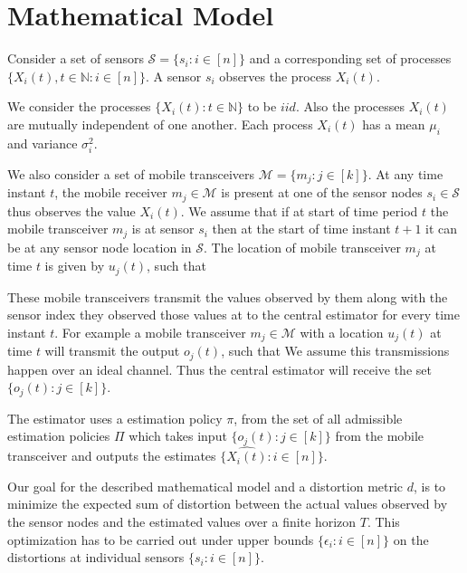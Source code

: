 \documentclass[a4paper,english,12pt]{article}
\begin{document}
\section{Mathematical Model}\label{model}
Consider a set of sensors $\mathcal{S}=\{s_i:i \in [n]\}$ and a corresponding set of processes  $\{X_i(t), t \in \mathbb{N} : i \in [n]\}$. A sensor $s_i$ observes the process $X_i(t)$. 
 
We consider the processes $\{X_i(t): t \in \mathbb{N}\}$  to be $\textit{iid}$. Also the processes $X_i(t)$ are mutually independent of one another. Each process $X_i(t)$ has a mean  $\mu_i$ and variance  $\sigma_i^2$.

We also consider a set of mobile transceivers $\mathcal{M}=\{m_j: j \in [k]\}$. At any time instant $t$, the mobile receiver $m_j \in \mathcal{M}$ is present at one of the sensor nodes $s_i \in \mathcal{S}$ thus observes the value $X_i(t)$. We assume that if at start of time period $t$ the mobile transceiver $m_j$ is at sensor $s_i$ then at the start of time instant $t+1$ it can be at any sensor node location in $\mathcal{S}$.   The location of mobile transceiver $m_j$ at time $t$ is given by $u_j(t)$, such that 

These mobile transceivers transmit the values observed by them along with the sensor index they observed those values at to the central estimator for every time instant $t$. For example a mobile transceiver $m_j \in \mathcal{M}$ with a location $u_j(t)$ at time $t$ will transmit the output $o_j(t)$,  such that  %
 We assume this transmissions happen over an ideal channel. Thus the central estimator will receive the set $\{o_j(t): j \in [k]   \}$.

The estimator uses a  estimation policy $\pi$, from the set of all admissible estimation policies $\Pi$ %
which takes input $\{o_j(t): j \in [k]   \}$ from the mobile transceiver and outputs the estimates $\{\hat{X_i(t)}: i \in [n] \}$.


Our goal for the described mathematical model and a distortion metric $d$,   is to minimize the expected sum of distortion between the actual values observed by the sensor nodes  and the estimated values over a finite horizon $T$. This optimization has to be carried out under upper bounds $\{\epsilon_i: i \in [n]\}$ on the distortions at individual sensors $\{s_i:i \in [n]\}$.
\end{document}
